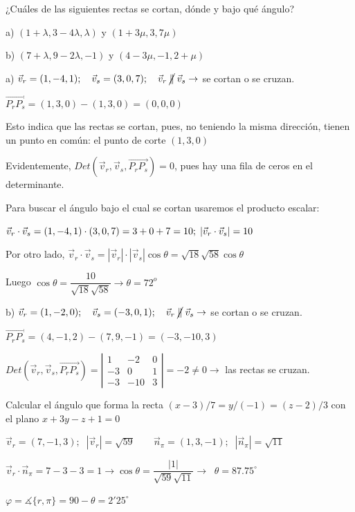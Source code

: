 \begin{ejre} ¿Cuáles de las siguientes rectas se cortan, dónde y bajo qué ángulo?

a)  $(1+\lambda,  3-4\lambda, \lambda)$ y $(1+3\mu, 3, 7\mu)$  

b) $(7+\lambda, 9-2\lambda, -1)$ y $(4-3\mu, -1, 2+\mu)$
\end{ejre}
\begin{proofw}\renewcommand{\qedsymbol}{$\diamond$}	

\noindent a) $\vec v_r=(1,-4,1);\quad \vec v_s=(3,0,7);\quad \vec v_r \;\cancel{\parallel}\; \vec v_s \to $ se cortan o se cruzan.

\noindent $\overrightarrow{P_rP_s}=(1,3,0)-(1,3,0)=(0,0,0)$

\noindent Esto indica que las rectas se cortan, pues, no teniendo la misma dirección, tienen un punto en común: el punto de corte $(1,3,0)$

\noindent \textcolor{gris}{Evidentemente, $Det(\vec v_r,\vec v_s, \overrightarrow{P_rP_s})=0$, pues hay una fila de ceros en el determinante.}

\noindent Para buscar el ángulo bajo el cual se cortan usaremos el producto escalar:

\noindent $\vec v_r\cdot \vec v_s= (1,-4,1)\cdot (3,0,7)=3+0+7=10; \; \abs{\vec v_r\cdot \vec v_s}=10$

\noindent Por otro lado, $\vec v_r \cdot \vec v_s=|\vec v_r|\cdot |\vec v_s| \cos \theta = \sqrt{18}\sqrt{58}\cos \theta$

\noindent Luego $\cos \theta = \dfrac {10}{\sqrt{18}\sqrt{58}}\to \theta=72^o$

\noindent b) $\vec v_r=(1,-2,0);\quad \vec v_s=(-3,0,1);\quad \vec v_r \;\cancel{\parallel}\; \vec v_s \to $ se cortan o se cruzan.

\noindent $\overrightarrow{P_rP_s}=(4,-1,2)-(7,9,-1)=(-3,-10,3)$

\noindent $Det(\vec v_r,\vec v_s, \overrightarrow{P_rP_s})=\left| \begin{matrix} 1&-2&0\\-3&0&1\\-3&-10&3 \end{matrix}\right| =-2\neq 0 \to $ las rectas se cruzan.
\end{proofw}

\begin{ejre} Calcular el ángulo que forma la recta $(x-3)/7 = y/(-1) = (z-2)/3$ con el plano $x+3y-z+1=0$	
\end{ejre}
\begin{proofw}\renewcommand{\qedsymbol}{$\diamond$}	
$\vec v_r=(7,-1,3);\;\;|\vec v_r|=\sqrt{59}$
$\;\quad$
$\vec n_{\pi}=(1,3,-1);\;\;|\vec n_{\pi}|=\sqrt{11}$

\noindent $\vec v_r \cdot \vec n_{\pi}=7-3-3=1 \to \cos \theta=\dfrac{|1|}{\sqrt{59}\sqrt{11}} \to \;\;\theta=87.75^{\circ}$

\noindent $\varphi = \measuredangle \{r,\pi\}= 90-\theta=2'25^{\circ}$	
\end{proofw}

